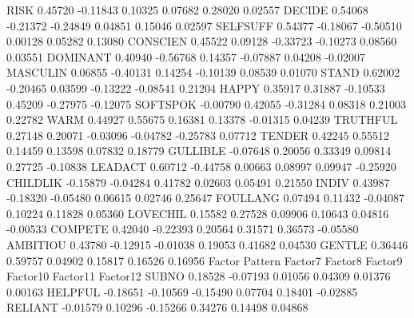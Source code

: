\documentclass{article}
\begin{document}
\begin{Woutput}
RISK            0.45720       -0.11843        0.10325        0.07682        0.28020        0.02557
DECIDE          0.54068       -0.21372       -0.24849        0.04851        0.15046        0.02597
SELFSUFF        0.54377       -0.18067       -0.50510        0.00128        0.05282        0.13080
CONSCIEN        0.45522        0.09128       -0.33723       -0.10273        0.08560        0.03551
DOMINANT        0.40940       -0.56768        0.14357       -0.07887        0.04208       -0.02007
MASCULIN        0.06855       -0.40131        0.14254       -0.10139        0.08539        0.01070
STAND           0.62002       -0.20465        0.03599       -0.13222       -0.08541        0.21204
HAPPY           0.35917        0.31887       -0.10533        0.45209       -0.27975       -0.12075
SOFTSPOK       -0.00790        0.42055       -0.31284        0.08318        0.21003        0.22782
WARM            0.44927        0.55675        0.16381        0.13378       -0.01315        0.04239
TRUTHFUL        0.27148        0.20071       -0.03096       -0.04782       -0.25783        0.07712
TENDER          0.42245        0.55512        0.14459        0.13598        0.07832        0.18779
GULLIBLE       -0.07648        0.20056        0.33349        0.09814        0.27725       -0.10838
LEADACT         0.60712       -0.44758        0.00663        0.08997        0.09947       -0.25920
CHILDLIK       -0.15879       -0.04284        0.41782        0.02603        0.05491        0.21550
INDIV           0.43987       -0.18320       -0.05480        0.06615        0.02746        0.25647
FOULLANG        0.07494        0.11432       -0.04087        0.10224        0.11828        0.05360
LOVECHIL        0.15582        0.27528        0.09906        0.10643        0.04816       -0.00533
COMPETE         0.42040       -0.22393        0.20564        0.31571        0.36573       -0.05580
AMBITIOU        0.43780       -0.12915       -0.01038        0.19053        0.41682        0.04530
GENTLE          0.36446        0.59757        0.04902        0.15817        0.16526        0.16956
                                          Factor Pattern
                Factor7        Factor8        Factor9       Factor10       Factor11       Factor12
SUBNO           0.18528       -0.07193        0.01056        0.04309        0.01376        0.00163
HELPFUL        -0.18651       -0.10569       -0.15490        0.07704        0.18401       -0.02885
RELIANT        -0.01579        0.10296       -0.15266        0.34276        0.14498        0.04868


\end{Woutput}
\end{document}
